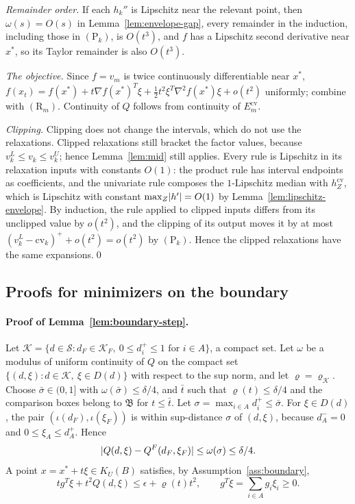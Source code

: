 \emph{Remainder order.} If each $h_k''$ is Lipschitz near the relevant
point, then $\omega(s)=O(s)$ in Lemma~\ref{lem:envelope-gap}, every remainder
in the induction, including those in $(\mathrm P_k)$, is $O(t^3)$, and $f$ has
a Lipschitz second derivative near $x^*$, so its Taylor remainder is also
$O(t^3)$.

\emph{The objective.} Since $f=v_m$ is twice continuously differentiable near
$x^*$, $f(x_t)=f(x^*)+t\nabla f(x^*)^T\xi+\tfrac12t^2\xi^T\nabla^2f(x^*)\xi+o(t^2)$
uniformly; combine with $(\mathrm R_m)$. Continuity of $Q$ follows from
continuity of $E_m^{\mathrm{cv}}$.

\emph{Clipping.} Clipping does not change the intervals, which do not use
the relaxations. Clipped relaxations still bracket the factor values,
because $v_k^L\le v_k\le v_k^U$; hence Lemma~\ref{lem:mid} still applies.
Every rule is Lipschitz in its relaxation inputs with constants $O(1)$: the
product rule has interval endpoints as coefficients, and the univariate rule
composes the $1$-Lipschitz median with $h^{\mathrm{cv}}_Z$, which is
Lipschitz with constant $\max_Z\lvert h'\rvert=O(1)$ by
Lemma~\ref{lem:lipschitz-envelope}. By induction, the rule applied to
clipped inputs differs from its unclipped value by $o(t^2)$, and the
clipping of its output moves it by at most
$(v_k^L-\mathrm{cv}_k)^++o(t^2)=o(t^2)$ by $(\mathrm P_k)$. Hence the clipped
relaxations have the same expansions.\qed

\subsection{Proofs for minimizers on the boundary}\label{sec:local-proofs-boundary}

\paragraph{Proof of Lemma~\ref{lem:boundary-step}.}
Let $\mathcal K=\{d\in\mathcal S:d_F\in\mathcal K_F,\ 0\le d_i^+\le1\text{ for }i\in A\}$,
a compact set. Let $\omega$ be a modulus of uniform continuity of $Q$ on the
compact set $\{(d,\xi):d\in\mathcal K,\ \xi\in D(d)\}$ with respect to the sup
norm, and let $\varrho=\varrho_{\mathcal K}$. Choose $\bar\sigma\in(0,1]$ with
$\omega(\bar\sigma)\le\delta/4$, and $\bar t$ such that $\varrho(t)\le\delta/4$
and the comparison boxes belong to $\mathfrak B$ for $t\le\bar t$. Let
$\sigma=\max_{i\in A}d_i^+\le\bar\sigma$. For $\xi\in D(d)$, the pair
$(\iota(d_F),\iota(\xi_F))$ is within sup-distance $\sigma$ of $(d,\xi)$,
because $d_A^-=0$ and $0\le\xi_A\le d_A^+$. Hence
\begin{equation}\label{eq:boundary-continuity}
  \lvert Q(d,\xi)-Q^F(d_F,\xi_F)\rvert\le\omega(\sigma)\le\delta/4.
\end{equation}
A point $x=x^*+t\xi\in K_U(B)$ satisfies, by Assumption~\ref{ass:boundary},
\begin{equation}\label{eq:boundary-retained}
  tg^T\xi+t^2Q(d,\xi)\le\epsilon+\varrho(t)t^2,\qquad
  g^T\xi=\sum_{i\in A}g_i\xi_i\ge0.
\end{equation}


